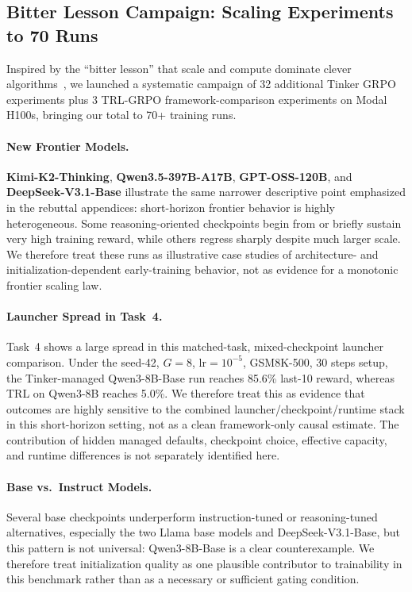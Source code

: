 \documentclass{article}
\begin{document}
\subsection{Bitter Lesson Campaign: Scaling Experiments to 70 Runs}
\label{sec:bitter_lesson}

Inspired by the ``bitter lesson'' that scale and compute dominate clever algorithms~\cite{schulman2017proximal}, we launched a systematic campaign of 32 additional Tinker GRPO experiments plus 3 TRL-GRPO framework-comparison experiments on Modal H100s, bringing our total to 70+ training runs.

\paragraph{New Frontier Models.}
\textbf{Kimi-K2-Thinking}, \textbf{Qwen3.5-397B-A17B}, \textbf{GPT-OSS-120B},
and \textbf{DeepSeek-V3.1-Base} illustrate the same narrower descriptive
point emphasized in the rebuttal appendices: short-horizon frontier behavior
is highly heterogeneous. Some reasoning-oriented checkpoints begin from or
briefly sustain very high training reward, while others regress sharply
despite much larger scale. We therefore treat these runs as illustrative case
studies of architecture- and initialization-dependent early-training
behavior, not as evidence for a monotonic frontier scaling law.

\paragraph{Launcher Spread in Task~4.}
Task~4 shows a large spread in this matched-task, mixed-checkpoint launcher
comparison. Under the seed-42, $G=8$, lr$=10^{-5}$, GSM8K-500, 30 steps setup, the Tinker-managed
Qwen3-8B-Base run reaches 85.6\% last-10 reward, whereas TRL on Qwen3-8B
reaches 5.0\%. We therefore treat this as evidence that outcomes are highly
sensitive to the combined launcher/checkpoint/runtime stack in this
short-horizon setting, not as a clean framework-only causal estimate. The
contribution of hidden managed defaults, checkpoint choice, effective
capacity, and runtime differences is not separately identified here.

\paragraph{Base vs.~Instruct Models.}
Several base checkpoints underperform instruction-tuned or reasoning-tuned
alternatives, especially the two Llama base models and DeepSeek-V3.1-Base, but
this pattern is not universal: Qwen3-8B-Base is a clear counterexample. We
therefore treat initialization quality as one plausible contributor to
trainability in this benchmark rather than as a necessary or sufficient gating
condition.
\end{document}
